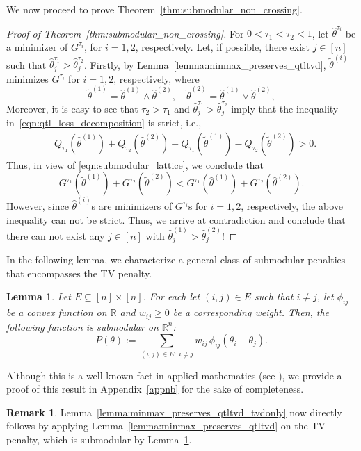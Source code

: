 \documentclass[11pt]{article}
\newcommand{\bR}{\mathbb{R}}
\theoremstyle{plain}
\newtheorem{lemma}[theorem]{Lemma}
\theoremstyle{definition}
\newtheorem{remark}{Remark}
\theoremstyle{remark}
\begin{document}
  We now proceed to prove Theorem~\ref{thm:submodular_non_crossing}.
\begin{proof}[Proof of Theorem~\ref{thm:submodular_non_crossing}]
     For $0<\tau_1<\tau_2<1$, let $\hat{\theta}^{\tau_i}$ be a minimizer of $G^{\tau_i}$, for $i=1,2$, respectively.     
     Let, if possible, there exist $j\in[n]$ such that $\hat{\theta}^{\tau_1}_j> \hat{\theta}^{\tau_2}_j$. Firstly, by Lemma~\ref{lemma:minmax_preserves_qtltvd}, $\tilde{\theta}^{(i)}$ minimizes $G^{\tau_i}$ for $i=1,2$, respectively, where
     \[
\tilde{\theta}^{(1)} = \hat{\theta}^{(1)} \wedge \hat{\theta}^{(2)},\quad\tilde{\theta}^{(2)} = \hat{\theta}^{(1)} \vee \hat{\theta}^{(2)},
\] 
Moreover, it is easy to see that $\tau_2>\tau_1$ and $\hat{\theta}^{\tau_1}_j> \hat{\theta}^{\tau_2}_j$ imply that the inequality in~\eqref{eqn:qtl_loss_decomposition} is strict, i.e.,
\begin{align*}
&Q_{\tau_{1}}\left(\hat{\theta}^{(1)}\right)+Q_{\tau_{2}}\left(\hat{\theta}^{(2)}\right) 
-  Q_{\tau_{1}}\left(\tilde{\theta}^{(1)}\right)-Q_{\tau_{2}}\left(\tilde{\theta}^{(2)}\right) >0.
\end{align*}
 Thus, in view of \eqref{eqn:submodular_lattice}, we conclude that
\[G^{\tau_1}(\tilde{\theta}^{(1)})+G^{\tau_2}(\tilde{\theta}^{(2)})< G^{\tau_1}(\hat{\theta}^{(1)})+G^{\tau_2}(\hat{\theta}^{(2)}).\]
However, since $\hat{\theta}^{(i)}$s are minimizers of $G^{\tau_i}$s for $i=1,2$, respectively, the above inequality can not be strict. Thus, we arrive at contradiction and conclude that there can not exist any $j\in [n]$ with $\hat{\theta}^{(1)}_j>\hat{\theta}^{(2)}_j$!
\end{proof}
 
In the following lemma, we characterize a general class of submodular penalties that encompasses the TV penalty.

 \begin{lemma}\label{lemma:general_submodular}
     Let $E\subseteq [n]\times [n]$. For each let $(i,j)\in E$ such that $i\neq j$, let $\phi_{ij}$ be a convex function on $\bR$ and $w_{ij}\geq 0$ be a corresponding weight. Then, the following function is submodular on $\bR^n$:
     \begin{equation}\label{eqn:example_submodular}
         P(\theta):=\sum_{(i,j)\in E:\;i\neq j}w_{ij}\,\phi_{ij}(\theta_i-\theta_j).
     \end{equation}
 \end{lemma}
 Although this is a well known fact in applied mathematics (see \cite{bach2019submodular}), we provide a proof of this result in Appendix~\ref{appnb} for the sake of completeness.
\begin{remark}
   Lemma~\ref{lemma:minmax_preserves_qtltvd_tvdonly} now directly follows by applying Lemma~\ref{lemma:minmax_preserves_qtltvd} on the TV penalty, which is submodular by Lemma~\ref{lemma:general_submodular}.
\end{remark}
\end{document}
